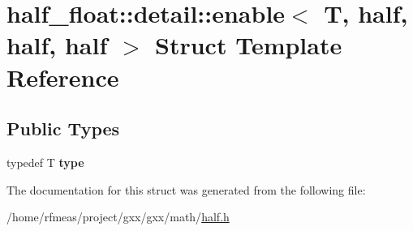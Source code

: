 \hypertarget{structhalf__float_1_1detail_1_1enable_3_01T_00_01half_00_01half_00_01half_01_4}{}\section{half\+\_\+float\+:\+:detail\+:\+:enable$<$ T, half, half, half $>$ Struct Template Reference}
\label{structhalf__float_1_1detail_1_1enable_3_01T_00_01half_00_01half_00_01half_01_4}
\subsection*{Public Types}
\begin{DoxyCompactItemize}
\item 
typedef T {\bfseries type}\hypertarget{structhalf__float_1_1detail_1_1enable_3_01T_00_01half_00_01half_00_01half_01_4_a68d2dce4e5c5dd4472e4a0532e221de8}{}\label{structhalf__float_1_1detail_1_1enable_3_01T_00_01half_00_01half_00_01half_01_4_a68d2dce4e5c5dd4472e4a0532e221de8}

\end{DoxyCompactItemize}


The documentation for this struct was generated from the following file\+:\begin{DoxyCompactItemize}
\item 
/home/rfmeas/project/gxx/gxx/math/\hyperlink{half_8h}{half.\+h}\end{DoxyCompactItemize}
